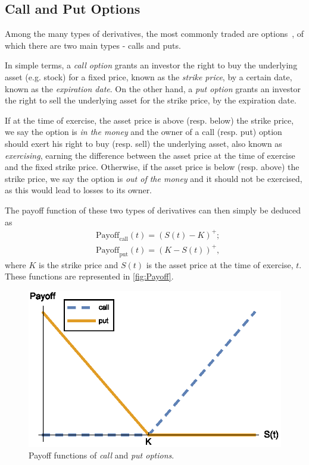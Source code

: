 \documentclass[a4paper,twocolumn,aps,prd,longbibliography,superscriptaddress]{revtex4-1}
\begin{document}
\subsection{Call and Put Options}
Among the many types of derivatives, the most commonly traded are options~\cite{Hull}, of which there are two main types - calls and puts.

In simple terms, a \textit{call option} grants an investor the right to buy the underlying asset (e.g. stock) for a fixed price, known as the \textit{strike price}, by a certain date, known as the \textit{expiration date}.
On the other hand, a \textit{put option} grants an investor the right to sell the underlying asset for the strike price, by the expiration date.

If at the time of exercise, the asset price is above (resp. below) the strike price, we say the option is \textit{in the money} and the owner of a call (resp. put) option should exert his right to buy (resp. sell) the underlying asset, also known as \textit{exercising}, earning the difference between the asset price at the time of exercise and the fixed strike price. Otherwise, if the asset price is below (resp. above) the strike price, we say the option is \textit{out of the money} and it should not be exercised, as this would lead to losses to its owner.

The payoff function of these two types of derivatives can then simply be deduced as
\begin{equation}\label{callput}
\begin{split}
&\text{Payoff}_\text{call}(t)=(S(t)-K)^+;\\
&\text{Payoff}_\text{put}(t)=(K-S(t))^+,
\end{split}
\end{equation}
\noindent where $K$ is the strike price and $S(t)$ is the asset price at the time of exercise, $t$. These functions are represented in \autoref{fig:Payoff}.

\begin{figure}[H]
    \centering
      \includegraphics[width=.9\columnwidth]{Payoff.eps}
      \caption{Payoff functions of \textit{call} and \textit{put options}.}\label{fig:Payoff}
    \end{figure}
\end{document}
